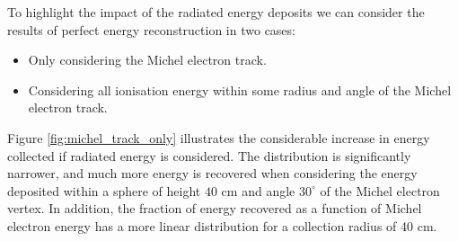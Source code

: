 To highlight the impact of the radiated energy deposits we can consider the 
results of perfect energy reconstruction in two cases:
\begin{itemize}
	\item Only considering the Michel electron track.
	\item Considering all ionisation energy within some radius and angle of the 
		Michel electron track.
\end{itemize}
Figure \ref{fig:michel_track_only} illustrates the considerable increase in 
energy collected if radiated energy is considered. The distribution is 
significantly narrower, and much more energy is recovered when considering the 
energy deposited within a sphere of height $40\mbox{ cm}$ and angle 
$30^\circ$ of the Michel electron vertex. In addition, the fraction of energy 
recovered as a function of Michel electron energy has a more linear 
distribution for a collection radius of 40 cm.
